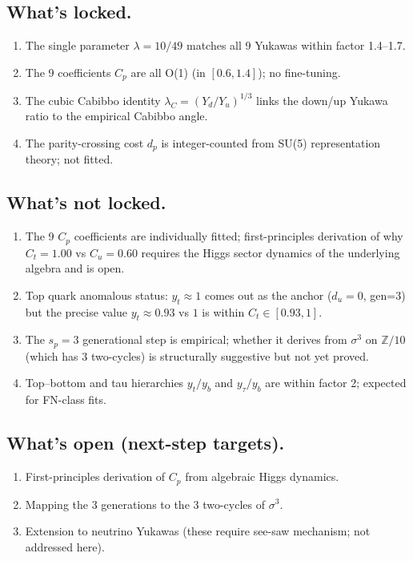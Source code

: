 \documentclass[11pt,reqno]{amsart}
\theoremstyle{plain}
\theoremstyle{definition}
\theoremstyle{remark}
\newcommand{\Z}{\mathbb{Z}}
\begin{document}
\subsection{What's locked.}
\begin{enumerate}
\item The single parameter $\lambda = 10/49$ matches all 9 Yukawas
within factor 1.4--1.7.
\item The 9 coefficients $C_p$ are all O(1) (in $[0.6, 1.4]$); no
fine-tuning.
\item The cubic Cabibbo identity $\lambda_C = (Y_d/Y_u)^{1/3}$ links
the down/up Yukawa ratio to the empirical Cabibbo angle.
\item The parity-crossing cost $d_p$ is integer-counted from SU(5)
representation theory; not fitted.
\end{enumerate}

\subsection{What's not locked.}
\begin{enumerate}
\item The 9 $C_p$ coefficients are individually fitted; first-principles
derivation of why $C_t = 1.00$ vs $C_u = 0.60$ requires the Higgs sector
dynamics of the underlying algebra and is open.
\item Top quark anomalous status: $y_t \approx 1$ comes out as the anchor
($d_u = 0$, gen=3) but the precise value $y_t \approx 0.93$ vs $1$ is
within $C_t \in [0.93, 1]$.
\item The $s_p = 3$ generational step is empirical; whether it derives
from $\sigma^3$ on $\Z/10$ (which has 3 two-cycles) is structurally
suggestive but not yet proved.
\item Top--bottom and tau hierarchies $y_t / y_b$ and $y_\tau / y_b$ are
within factor 2; expected for FN-class fits.
\end{enumerate}

\subsection{What's open (next-step targets).}
\begin{enumerate}
\item First-principles derivation of $C_p$ from algebraic Higgs dynamics.
\item Mapping the 3 generations to the 3 two-cycles of $\sigma^3$.
\item Extension to neutrino Yukawas (these require see-saw mechanism;
not addressed here).
\end{enumerate}
\end{document}
